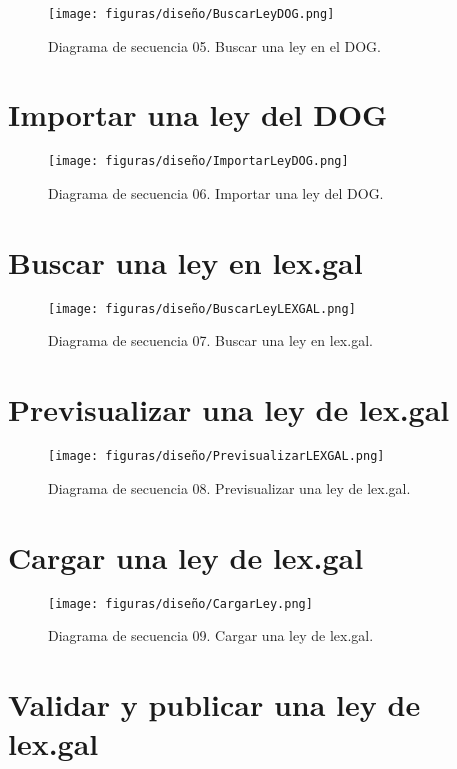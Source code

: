 \begin{figure}[H]
\centerline{\texttt{[image: figuras/diseño/BuscarLeyDOG.png]}}
\caption{Diagrama de secuencia 05. Buscar una ley en el DOG.}
\label{enlaceDBuscarDOG}
\end{figure}


\section{Importar una ley del DOG}

\begin{figure}[H]
\centerline{\texttt{[image: figuras/diseño/ImportarLeyDOG.png]}}
\caption{Diagrama de secuencia 06. Importar una ley del DOG.}
\label{enlaceDImportarDOG}
\end{figure}


\section{Buscar una ley en lex.gal}

\begin{figure}[H]
\centerline{\texttt{[image: figuras/diseño/BuscarLeyLEXGAL.png]}}
\caption{Diagrama de secuencia 07. Buscar una ley en lex.gal.}
\label{enlaceDBuscarLEXGAL}
\end{figure}


\section{Previsualizar una ley de lex.gal}

\begin{figure}[H]
\centerline{\texttt{[image: figuras/diseño/PrevisualizarLEXGAL.png]}}
\caption{Diagrama de secuencia 08. Previsualizar una ley de lex.gal.}
\label{enlaceDPrevisualizarLEXGAL}
\end{figure}


\section{Cargar una ley de lex.gal}

\begin{figure}[H]
\centerline{\texttt{[image: figuras/diseño/CargarLey.png]}}
\caption{Diagrama de secuencia 09. Cargar una ley de lex.gal.}
\label{enlaceDCargarLEXGAL}
\end{figure}


\section{Validar y publicar una ley de lex.gal}

